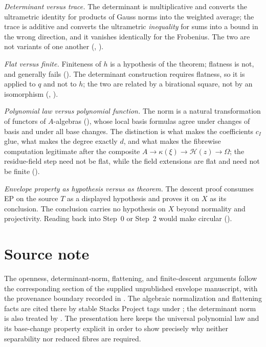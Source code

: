 \emph{Determinant versus trace.}  The determinant is multiplicative and
converts the ultrametric identity for products of Gauss norms into the
weighted average; the trace is additive and converts the ultrametric
\emph{inequality} for sums into a bound in the wrong direction, and it
vanishes identically for the Frobenius.  The two are not variants of one
another (,
).

\emph{Flat versus finite.}  Finiteness of $h$ is a hypothesis of the
theorem; flatness is not, and generally fails
().  The determinant construction requires
flatness, so it is applied to $q$ and not to $h$; the two are related by
a birational square, not by an isomorphism
(,
).

\emph{Polynomial law versus polynomial function.}  The norm is a natural
transformation of functors of $A$-algebras
(), whose local basis formulas agree under changes of basis and
under all base changes.  The distinction is what makes the coefficients $c_I$ glue, what
makes the degree exactly $d$, and what makes the fibrewise computation
legitimate after the composite
$A\to\kappa(\xi)\to\mathcal H(z)\to\Omega$;
the residue-field step need not be flat, while the field extensions are
flat and need not be finite ().

\emph{Envelope property as hypothesis versus as theorem.}  The descent proof consumes EP on the source $T$ as a displayed
hypothesis and proves it on $X$ as its conclusion.  The conclusion carries no
hypothesis on $X$ beyond normality and projectivity.  Reading
 back into Step~0 or Step~2 would make
circular ().

\section{Source note}
\label{sec:ch41-source-note}

The openness, determinant-norm, flattening, and finite-descent arguments
follow the corresponding section of the supplied unpublished envelope
manuscript, with the provenance boundary recorded in
.
The algebraic normalization and flattening facts are cited there by stable
Stacks Project tags under \cite{stacks-project}; the determinant norm is
also treated by \cite{FerrandNorm}.  The presentation here keeps the
universal polynomial law and its base-change property explicit in order to
show precisely why neither separability nor reduced fibres are required.

